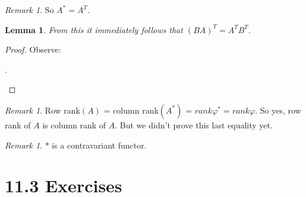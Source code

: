 \documentclass[9pt,reqno,twoside]{amsbook}
\theoremstyle{plain}
\numberwithin{section}{chapter}
\numberwithin{equation}{chapter}
\newtheorem{lem}[theorem]{Lemma}
\theoremstyle{definition}
\theoremstyle{remark}
\newtheorem{rem}[theorem]{Remark}
\theoremstyle{plain}
\renewcommand{\phi}{\varphi}
\begin{document}
\begin{rem}
So $A^* = A^T$. 
\end{rem}

\begin{lem}
From this it immediately follows that $(BA)^T = A^TB^T$. 
\end{lem}
\begin{proof}
Observe:
\begin{center}
.
\end{center}
\end{proof}

\begin{rem}
Row rank$(A)$ = column rank$(A^*)$ = $rank\phi^* = rank\phi$. So yes, row rank of $A$ is column rank of $A$. But we didn't prove this last equality yet. 
\end{rem}

\begin{rem}
$*$ is a contravariant functor. 
\end{rem}


\section*{11.3 Exercises}
\end{document}
